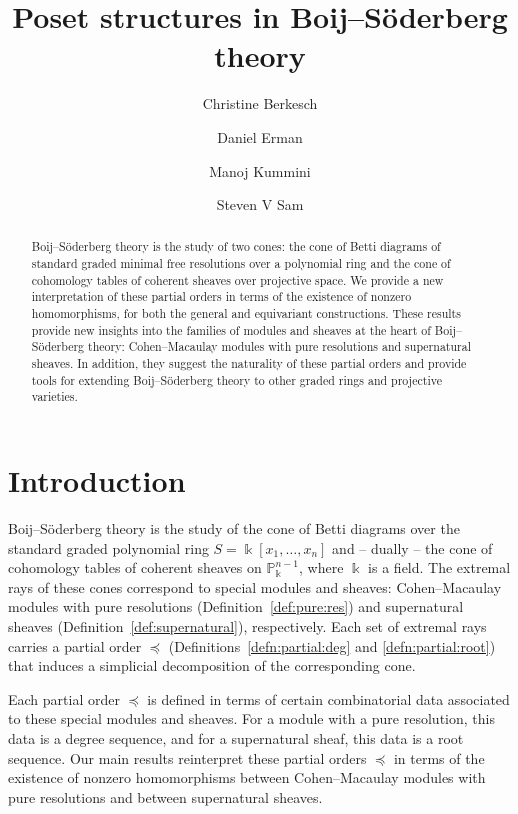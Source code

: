 \documentclass[12pt]{amsart}
\title{Poset structures in Boij--S\"oderberg theory}%
\author{Christine Berkesch}
\author{Daniel Erman}
\author{Manoj Kummini}
\author{Steven V Sam}
\date{}
\theoremstyle{definition}
\newcommand{\PP}{\mathbb{P}}
\begin{document}

\begin{abstract}%
%
  Boij--S\"oderberg theory is the study of two cones: the cone of Betti diagrams of 
  standard graded minimal free resolutions over a polynomial ring and
  the cone of cohomology tables of coherent sheaves over projective
  space.
%
We provide a new interpretation of these partial orders in terms of the
existence of nonzero homomorphisms, 
for both the general and equivariant constructions.
%
These results provide new insights into the families of modules and sheaves 
at the heart of Boij--S\"oderberg theory: 
Cohen--Macaulay modules with pure resolutions and supernatural sheaves. 
In addition, they suggest the naturality of these partial orders and
provide tools for extending Boij--S\"oderberg theory 
to other graded rings and projective varieties.
%
\end{abstract}%
\maketitle
\vspace{-.5cm}
\section{Introduction}%
\label{sec:intro}

Boij--S\"oderberg theory is the study of the 
cone of Betti diagrams over the standard graded polynomial ring 
$S=\Bbbk[x_1,\dots, x_n]$ and -- dually -- the 
cone of cohomology tables of coherent sheaves on $\PP^{n-1}_\Bbbk$, 
where $\Bbbk$ is a field.  The extremal rays of these
cones correspond to special modules and sheaves: 
Cohen--Macaulay modules with pure resolutions (Definition~\ref{def:pure:res}) 
and supernatural sheaves (Definition~\ref{def:supernatural}), respectively.  
Each set of extremal rays carries a partial order $\preceq$
(Definitions~\ref{defn:partial:deg} and \ref{defn:partial:root}) that
induces a simplicial decomposition of the corresponding cone.

Each partial order $\preceq$ is defined in terms of certain combinatorial
data associated to these special modules and sheaves. 
For a module with a pure resolution, this data is a degree sequence, and for
a supernatural sheaf, this data is a root sequence. 
Our main results reinterpret these partial orders $\preceq$ 
in terms of the existence of nonzero homomorphisms 
between Cohen--Macaulay modules with pure resolutions 
and between supernatural sheaves.
\end{document}
